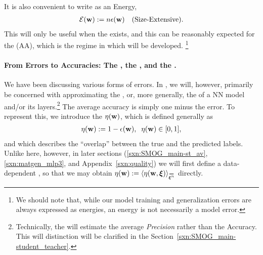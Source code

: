 It is also convenient to write \emph{\TotalEffectivePotential} as an Energy, 
\begin{align}
 \label{eqn:detox}
 \mathcal{E}(\mathbf{w}) := n\epsilon({\mathbf{w}})\quad \text{(Size-Extensive)}.
\end{align}
This will only be useful when the \ThermodynamicLimit exists, and this
can be reasonably expected for the \AnnealedApproximation (AA),
which is the regime in which \SETOL will be developed.%
\footnote{We should note that, while our model training and generalization errors are always expressed as energies, an energy is not necessarily a model error. }


\paragraph{From Errors to Accuracies: The \AverageGeneralizationAccuracy, the \Quality, and the \SelfOverlap.}
We have been discussing various forms of errors.
In \SETOL, we will, however, primarily be concerned with approximating the \emph{\AverageGeneralizationAccuracy},
or, more generally, the \Quality of a NN model and/or its layers.\footnote{Technically, the \Quality will estimate the average \emph{Precision} rather than the Accuracy.
This will distinction will be clarified in the Section~\ref{sxn:SMOG_main-student_teacher}.}
The average accuracy is simply one minus the error.
To represent this,
we introduce the \emph{\SelfOverlap} $\eta({\mathbf{w}})$, which is defined generally as
\begin{align}
 \label{eqn:def_eta}
 \eta({\mathbf{w}}) := 1 -\epsilon({\mathbf{w}}) ,\;\;\eta({\mathbf{w}})\in[0,1] ,
\end{align}
and which 
describes the ``overlap'' between the true and the predicted labels.
Unlike here, however, in later sections
(\ref{sxn:SMOG_main-st_av}, \ref{sxn:matgen_mlp3}, and Appendix~\ref{sxn:quality})
we will first define a data-dependent \SelfOverlap, so that we may obtain
 $\ETA(\WVEC):=\langle\ETA(\WVEC,\XI)\rangle_{\AVGNDXIn}$ directly.

